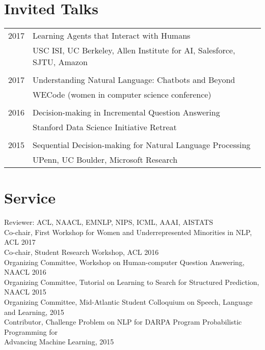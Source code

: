 \documentclass[a4paper,11pt]{article}
\begin{document}
\section{Invited Talks}
\begin{tabular}{rl}    
2017 & Learning Agents that Interact with Humans \\
& USC ISI, UC Berkeley, Allen Institute for AI, Salesforce, SJTU, Amazon\\
\\
2017 & Understanding Natural Language: Chatbots and Beyond\\
& WECode (women in computer science conference)\\
\\
2016 & Decision-making in Incremental Question Answering \\
& Stanford Data Science Initiative Retreat\\
\\
2015 & Sequential Decision-making for Natural Language Processing\\
& UPenn, UC Boulder, Microsoft Research\\
\end{tabular}

\section{Service}
{Reviewer:} ACL, NAACL, EMNLP, NIPS, ICML, AAAI, AISTATS\\
{Co-chair,} First Workshop for Women and Underrepresented Minorities in NLP, ACL 2017\\
{Co-chair,} Student Research Workshop, ACL 2016\\
{Organizing Committee,} Workshop on Human-computer Question Answering, NAACL 2016\\
{Organizing Committee,} Tutorial on Learning to Search for Structured Prediction, NAACL 2015\\
{Organizing Committee,} Mid-Atlantic Student Colloquium on Speech, Language and Learning, 2015\\
{Contributor,} Challenge Problem on NLP for DARPA Program Probabilistic Programming for\\
Advancing Machine Learning, 2015\\
\end{document}
